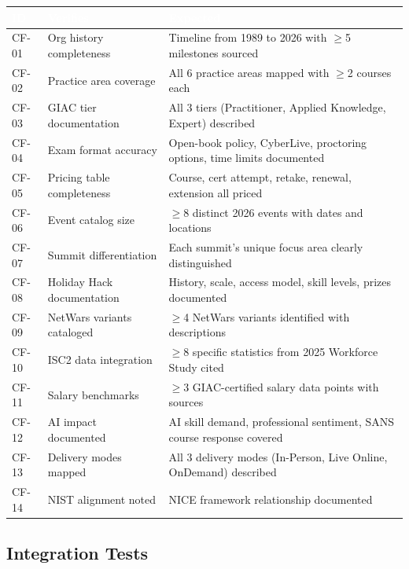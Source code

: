 \documentclass[11pt,letterpaper]{article}
\newcommand{\tableheader}[1]{\textbf{\sffamily\textcolor{white}{#1}}}
\begin{document}
\begin{center}
\begin{tabularx}{\textwidth}{C{1.2cm}L{3cm}X}
\toprule
{}
\tableheader{ID} & \tableheader{Verifies} & \tableheader{Expected} \\
\midrule
CF-01 & Org history completeness & Timeline from 1989 to 2026 with $\geq$5 milestones sourced \\
CF-02 & Practice area coverage & All 6 practice areas mapped with $\geq$2 courses each \\
CF-03 & GIAC tier documentation & All 3 tiers (Practitioner, Applied Knowledge, Expert) described \\
CF-04 & Exam format accuracy & Open-book policy, CyberLive, proctoring options, time limits documented \\
CF-05 & Pricing table completeness & Course, cert attempt, retake, renewal, extension all priced \\
CF-06 & Event catalog size & $\geq$8 distinct 2026 events with dates and locations \\
CF-07 & Summit differentiation & Each summit's unique focus area clearly distinguished \\
CF-08 & Holiday Hack documentation & History, scale, access model, skill levels, prizes documented \\
CF-09 & NetWars variants cataloged & $\geq$4 NetWars variants identified with descriptions \\
CF-10 & ISC2 data integration & $\geq$8 specific statistics from 2025 Workforce Study cited \\
CF-11 & Salary benchmarks & $\geq$3 GIAC-certified salary data points with sources \\
CF-12 & AI impact documented & AI skill demand, professional sentiment, SANS course response covered \\
CF-13 & Delivery modes mapped & All 3 delivery modes (In-Person, Live Online, OnDemand) described \\
CF-14 & NIST alignment noted & NICE framework relationship documented \\
\bottomrule
\end{tabularx}
\end{center}

\subsection{Integration Tests}
\end{document}
